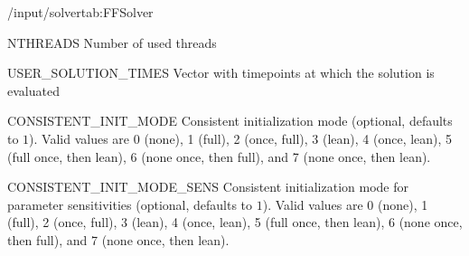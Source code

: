 \begin{groupscope}{/input/solver}{tab:FFSolver}
  \begin{dataset}[type=int,range={$\geq 1$},length=1]{NTHREADS}
    Number of used threads
  \end{dataset}
  \begin{dataset}[type=double,unit={\si{\second}},range={$\geq 0$},length={Arbitrary}]{USER\_SOLUTION\_TIMES}
    Vector with timepoints at which the solution is evaluated
  \end{dataset}
  \begin{dataset}[type=int,range={$\{ 0, \dots, 7\}$},length=1]{CONSISTENT\_INIT\_MODE}
    Consistent initialization mode (optional, defaults to $1$).
    Valid values are 0 (none), 1 (full), 2 (once, full), 3 (lean), 4 (once, lean), 5 (full once, then lean), 6 (none once, then full), and 7 (none once, then lean).
  \end{dataset}
  \begin{dataset}[type=int,range={$\{ 0, \dots, 7\}$},length=1]{CONSISTENT\_INIT\_MODE\_SENS}
    Consistent initialization mode for parameter sensitivities (optional, defaults to $1$).
    Valid values are 0 (none), 1 (full), 2 (once, full), 3 (lean), 4 (once, lean), 5 (full once, then lean), 6 (none once, then full), and 7 (none once, then lean).
  \end{dataset}
\end{groupscope}

